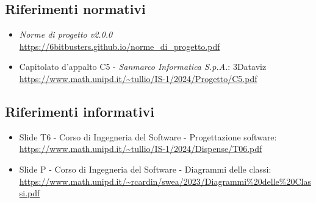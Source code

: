 \subsection{Riferimenti normativi}
\begin{itemize}
      \item \textit{Norme di progetto v2.0.0} \\ \url{https://6bitbusters.github.io/norme_di_progetto.pdf}
      \item Capitolato d'appalto C5 - \textit{Sanmarco Informatica S.p.A.}: 3Dataviz \\
            \url{https://www.math.unipd.it/~tullio/IS-1/2024/Progetto/C5.pdf}
\end{itemize}

\subsection{Riferimenti informativi}
\begin{itemize}
      \item Slide T6 - Corso di Ingegneria del Software - Progettazione software: \\
            \url{https://www.math.unipd.it/~tullio/IS-1/2024/Dispense/T06.pdf}
      \item Slide P - Corso di Ingegneria del Software - Diagrammi delle classi: \\
            \url{https://www.math.unipd.it/~rcardin/swea/2023/Diagrammi%20delle%20Classi.pdf}
\end{itemize}
